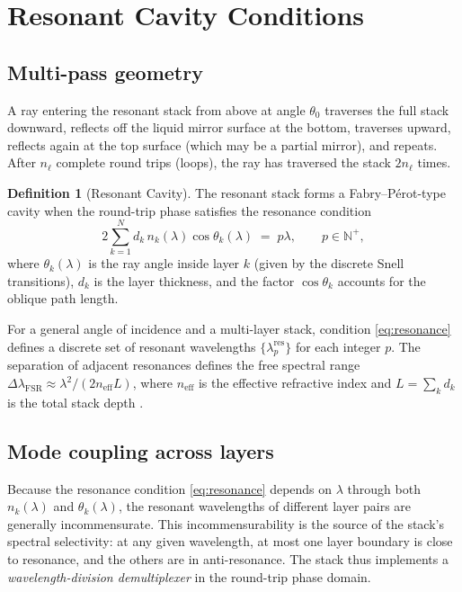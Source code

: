 \documentclass[11pt,twocolumn,a4paper]{article}
\theoremstyle{plain}
\theoremstyle{definition}
\newtheorem{definition}[theorem]{Definition}
\theoremstyle{remark}
\newcommand{\N}{\mathbb{N}}
\begin{document}
\section{Resonant Cavity Conditions}
\label{sec:cavity}

\subsection{Multi-pass geometry}

A ray entering the resonant stack from above at angle $\theta_0$ traverses the full stack downward, reflects off the liquid mirror surface at the bottom, traverses upward, reflects again at the top surface (which may be a partial mirror), and repeats. After $n_\ell$ complete round trips (loops), the ray has traversed the stack $2n_\ell$ times.

\begin{definition}[Resonant Cavity]
\label{def:cavity}
The resonant stack forms a Fabry--P\'{e}rot-type cavity \cite{Fabry1899, FabryPerot1899} when the round-trip phase satisfies the resonance condition
\begin{equation}
\label{eq:resonance}
  2\sum_{k=1}^N d_k\,n_k(\lambda)\cos\theta_k(\lambda) \;=\; p\lambda, \qquad p\in\N^+,
\end{equation}
where $\theta_k(\lambda)$ is the ray angle inside layer $k$ (given by the discrete Snell transitions), $d_k$ is the layer thickness, and the factor $\cos\theta_k$ accounts for the oblique path length.
\end{definition}

For a general angle of incidence and a multi-layer stack, condition \eqref{eq:resonance} defines a discrete set of resonant wavelengths $\{\lambda_p^\text{res}\}$ for each integer $p$. The separation of adjacent resonances defines the free spectral range $\Delta\lambda_\text{FSR}\approx\lambda^2/(2n_\text{eff}L)$, where $n_\text{eff}$ is the effective refractive index and $L=\sum_k d_k$ is the total stack depth \cite{SalehTeich2007}.

\subsection{Mode coupling across layers}

Because the resonance condition \eqref{eq:resonance} depends on $\lambda$ through both $n_k(\lambda)$ and $\theta_k(\lambda)$, the resonant wavelengths of different layer pairs are generally incommensurate. This incommensurability is the source of the stack's spectral selectivity: at any given wavelength, at most one layer boundary is close to resonance, and the others are in anti-resonance. The stack thus implements a \emph{wavelength-division demultiplexer} in the round-trip phase domain.
\end{document}
